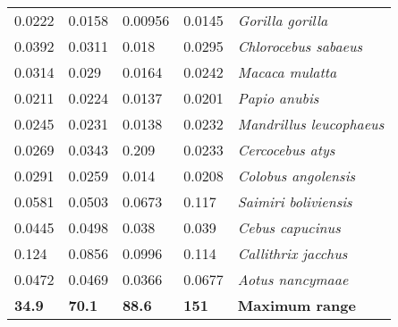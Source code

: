 \begin{tabular}{lllll}
         0.0222 &          0.0158 &         0.00956 &         0.0145 &                      \textit{Gorilla gorilla} \\
         0.0392 &          0.0311 &           0.018 &         0.0295 &                  \textit{Chlorocebus sabaeus} \\
         0.0314 &           0.029 &          0.0164 &         0.0242 &                       \textit{Macaca mulatta} \\
         0.0211 &          0.0224 &          0.0137 &         0.0201 &                         \textit{Papio anubis} \\
         0.0245 &          0.0231 &          0.0138 &         0.0232 &               \textit{Mandrillus leucophaeus} \\
         0.0269 &          0.0343 &           0.209 &         0.0233 &                      \textit{Cercocebus atys} \\
         0.0291 &          0.0259 &           0.014 &         0.0208 &                   \textit{Colobus angolensis} \\
         0.0581 &          0.0503 &          0.0673 &          0.117 &                  \textit{Saimiri boliviensis} \\
         0.0445 &          0.0498 &           0.038 &          0.039 &                      \textit{Cebus capucinus} \\
          0.124 &          0.0856 &          0.0996 &          0.114 &                   \textit{Callithrix jacchus} \\
         0.0472 &          0.0469 &          0.0366 &         0.0677 &                      \textit{Aotus nancymaae} \\
 \textbf{ 34.9} &  \textbf{ 70.1} &  \textbf{ 88.6} &  \textbf{ 151} &                        \textbf{Maximum range} \\
\bottomrule
\end{tabular}
